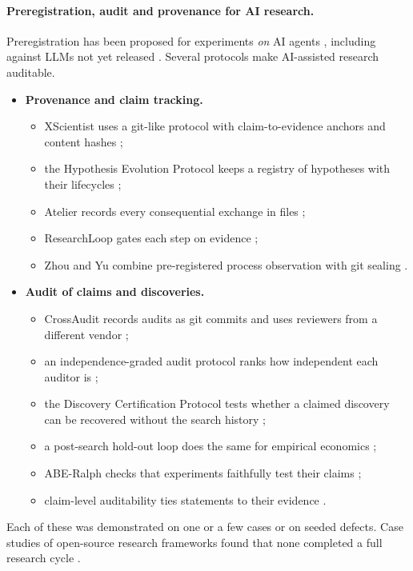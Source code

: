 \documentclass[11pt]{article}
\begin{document}
\paragraph{Preregistration, audit and provenance for AI research.} Preregistration has been proposed for experiments
\emph{on} AI agents \citep{vaccaro2026prereg}, including against LLMs not yet released \citep{thomas2026next}. Several
protocols make AI-assisted research auditable.
\begin{itemize}
\item \textbf{Provenance and claim tracking.}
  \begin{itemize}
  \item XScientist uses a git-like protocol with claim-to-evidence anchors and content hashes
  \citep{xscientist2026};
  \item the Hypothesis Evolution Protocol keeps a registry of hypotheses with their lifecycles \citep{hep2026};
  \item Atelier records every consequential exchange in files \citep{atelier2026};
  \item ResearchLoop gates each step on evidence \citep{researchloop2026};
  \item Zhou and Yu combine pre-registered process observation with git sealing \citep{zhou2026preregprocess}.
  \end{itemize}
\item \textbf{Audit of claims and discoveries.}
  \begin{itemize}
  \item CrossAudit records audits as git commits and uses reviewers from a different vendor
  \citep{crossaudit2026};
  \item an independence-graded audit protocol ranks how independent each auditor is \citep{ghanem2026whoaudits};
  \item the Discovery Certification Protocol tests whether a claimed discovery can be recovered without the search
  history \citep{dcp2026};
  \item a post-search hold-out loop does the same for empirical economics \citep{shin2026auditable};
  \item ABE-Ralph checks that experiments faithfully test their claims \citep{abe2026fidelity};
  \item claim-level auditability ties statements to their evidence \citep{rasheed2026claimlevel}.
  \end{itemize}
\end{itemize}
Each of these was demonstrated on one or a few cases or on seeded defects. Case studies of open-source research
frameworks found that none completed a full research cycle \citep{agrawal2026case}.
\end{document}
